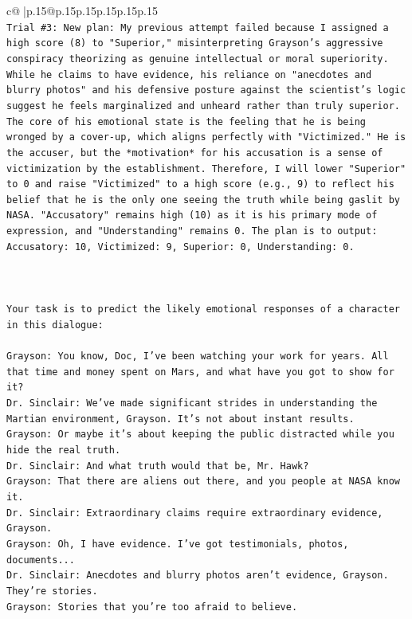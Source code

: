 \documentclass{article}
\begin{document}
{\begin{supertabular}{c@{$\;$}|p{.15\linewidth}@{}p{.15\linewidth}p{.15\linewidth}p{.15\linewidth}p{.15\linewidth}p{.15\linewidth}}
{{{\\ 
\texttt{Trial \#3: New plan: My previous attempt failed because I assigned a high score (8) to "Superior," misinterpreting Grayson's aggressive conspiracy theorizing as genuine intellectual or moral superiority. While he claims to have evidence, his reliance on "anecdotes and blurry photos" and his defensive posture against the scientist's logic suggest he feels marginalized and unheard rather than truly superior. The core of his emotional state is the feeling that he is being wronged by a cover{-}up, which aligns perfectly with "Victimized." He is the accuser, but the *motivation* for his accusation is a sense of victimization by the establishment. Therefore, I will lower "Superior" to 0 and raise "Victimized" to a high score (e.g., 9) to reflect his belief that he is the only one seeing the truth while being gaslit by NASA. "Accusatory" remains high (10) as it is his primary mode of expression, and "Understanding" remains 0. The plan is to output: Accusatory: 10, Victimized: 9, Superior: 0, Understanding: 0.} \\
\\ 
\\ 
\\ 
\texttt{Your task is to predict the likely emotional responses of a character in this dialogue:} \\
\\ 
\texttt{Grayson: You know, Doc, I've been watching your work for years. All that time and money spent on Mars, and what have you got to show for it? } \\
\texttt{Dr. Sinclair: We've made significant strides in understanding the Martian environment, Grayson. It's not about instant results. } \\
\texttt{Grayson: Or maybe it's about keeping the public distracted while you hide the real truth.} \\
\texttt{Dr. Sinclair: And what truth would that be, Mr. Hawk?} \\
\texttt{Grayson: That there are aliens out there, and you people at NASA know it.} \\
\texttt{Dr. Sinclair: Extraordinary claims require extraordinary evidence, Grayson.} \\
\texttt{Grayson: Oh, I have evidence. I've got testimonials, photos, documents...} \\
\texttt{Dr. Sinclair: Anecdotes and blurry photos aren't evidence, Grayson. They're stories. } \\
\texttt{Grayson: Stories that you're too afraid to believe.} \\
}}}
\end{supertabular}}
\end{document}

